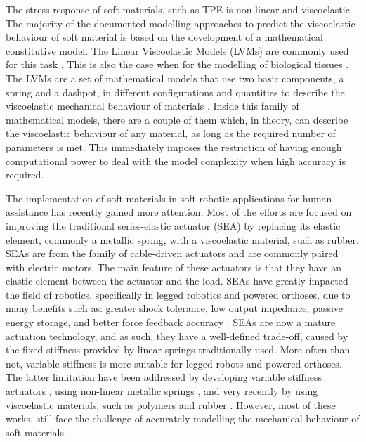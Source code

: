 The stress response of soft materials, such as TPE is non-linear and viscoelastic. The majority of the documented modelling approaches to predict the viscoelastic behaviour of soft material is based on the development of a mathematical constitutive model. The Linear Viscoelastic Models (LVMs) are commonly used for this task \cite{xu2014mathematical,tirella2014strain,lu2017constitutive,ciniello2017identifying}. This is also the case when for the modelling of biological tissues \cite{sanjeevi1982viscoelastic}. The LVMs are a set of mathematical models that use two basic components, a spring and a dashpot, in different configurations and quantities to describe the viscoelastic mechanical behaviour of materials \cite{roylance2001engineering}. Inside this family of mathematical models, there are a couple of them which, in theory, can describe the viscoelastic behaviour of any material, as long as the required number of parameters is met. This immediately imposes the restriction of having enough computational power to deal with the model complexity when high accuracy is required.

The implementation of soft materials in soft robotic applications for human assistance has recently gained more attention. Most of the efforts are focused on improving the traditional series-elastic actuator (SEA) by replacing its elastic element, commonly a metallic spring, with a viscoelastic material, such as rubber. SEAs are from the family of cable-driven actuators and are commonly paired with electric motors. The main feature of these actuators is that they have an elastic element between the actuator and the load. SEAs have greatly impacted the field of robotics, specifically in legged robotics and powered orthoses, due to many benefits such as: greater shock tolerance, low output impedance, passive energy storage, and better force feedback accuracy \cite{pratt1995series,pratt2004series,au2008powered}. SEAs are now a mature actuation technology, and as such, they have a well-defined trade-off, caused by the fixed stiffness provided by linear springs traditionally used. More often than not, variable stiffness is more suitable for legged robots and powered orthoses. The latter limitation have been addressed by developing variable stiffness actuators \cite{groothuis2012vsaut}, using non-linear metallic springs \cite{migliore2007novel}, and very recently by using viscoelastic materials, such as polymers and rubber \cite{rollinson2013design,parietti2011series,schepelmann2014compact}. However, most of these works, still face the challenge of accurately modelling the mechanical behaviour of soft materials. 

